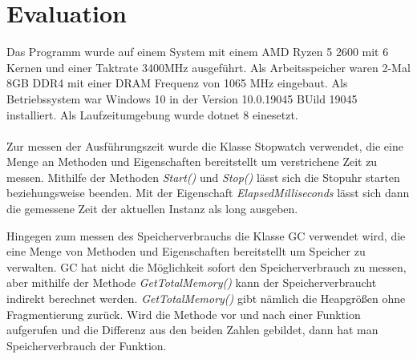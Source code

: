 \documentclass{article}
\begin{document}
    \section{Evaluation}
    \label{Evaluation}
    Das Programm wurde auf einem System mit einem AMD Ryzen 5 2600 mit 6 Kernen und einer Taktrate 3400MHz ausgeführt. Als Arbeitsspeicher waren 2-Mal 8GB DDR4 mit einer DRAM Frequenz von 1065 MHz eingebaut. 
    Als Betriebssystem war Windows 10 in der Version 10.0.19045 BUild 19045 installiert. Als Laufzeitumgebung wurde dotnet 8 einesetzt.\\
    \\
    Zur messen der Ausführungszeit wurde die Klasse Stopwatch verwendet, die eine Menge an Methoden und Eigenschaften bereitstellt um verstrichene Zeit zu messen.
    Mithilfe der Methoden \textit{Start()} und \textit{Stop()} lässt sich die Stopuhr starten beziehungsweise beenden. Mit der Eigenschaft \textit{ElapsedMilliseconds} lässt sich dann die gemessene Zeit der aktuellen Instanz als long ausgeben.\par
    Hingegen zum messen des Speicherverbrauchs die Klasse GC verwendet wird, die eine Menge von Methoden und Eigenschaften bereitstellt um Speicher zu verwalten.
    GC hat nicht die Möglichkeit sofort den Speicherverbrauch zu messen, aber mithilfe der Methode \textit{GetTotalMemory()} kann der Speicherverbraucht indirekt berechnet werden.
    \textit{GetTotalMemory()} gibt nämlich die Heapgrößen ohne Fragmentierung zurück. 
    Wird die Methode vor und nach einer Funktion aufgerufen und die Differenz aus den beiden Zahlen gebildet, dann hat man Speicherverbrauch der Funktion.
    \newpage
    \renewcommand{\refname}{}
\end{document}
